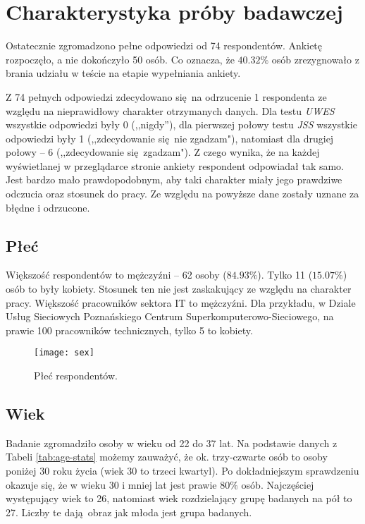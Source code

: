 \chapter{Charakterystyka próby badawczej} 
\label{sec:group}
Ostatecznie zgromadzono pełne odpowiedzi od 74 respondentów. Ankietę rozpoczęło, a nie dokończyło 50 osób. Co oznacza, że $40.32\%$ osób zrezygnowało z brania udziału w teście na etapie wypełniania ankiety. 

Z 74 pełnych odpowiedzi zdecydowano się na odrzucenie 1 respondenta ze względu na nieprawidłowy charakter otrzymanych danych. Dla testu \emph{UWES} wszystkie odpowiedzi były 0 (,,nigdy''), dla pierwszej połowy testu \emph{JSS} wszystkie odpowiedzi były 1 (,,zdecydowanie się nie zgadzam"), natomiast dla drugiej połowy -- 6 (,,zdecydowanie się zgadzam"). Z czego wynika, że na każdej wyświetlanej w przeglądarce stronie ankiety respondent odpowiadał tak samo. Jest bardzo mało
prawdopodobnym, aby taki charakter miały jego prawdziwe odczucia oraz stosunek do pracy. Ze względu na powyższe dane zostały uznane za błędne i odrzucone.
\section{Płeć}
Większość respondentów to mężczyźni -- 62 osoby ($84.93\%$). Tylko 11 ($15.07\%$) osób to były kobiety. Stosunek ten nie jest zaskakujący ze względu na charakter pracy. Większość pracowników sektora IT to mężczyźni. Dla przykładu, w Dziale Usług Sieciowych Poznańskiego Centrum Superkomputerowo-Sieciowego, na prawie 100 pracowników technicznych, tylko 5 to kobiety.

\begin{figure}[h]
\begin{center}
\texttt{[image: sex]}
\end{center}
\caption{Płeć respondentów.}
\label{fig:sex}
\end{figure}

\section{Wiek}
\label{sec:group-age}

Badanie zgromadziło osoby w wieku od 22 do 37 lat. Na podstawie danych z Tabeli \ref{tab:age-stats} możemy zauważyć, że ok. trzy-czwarte osób to osoby poniżej 30 roku życia (wiek 30 to trzeci kwartyl). Po dokładniejszym sprawdzeniu okazuje się, że w wieku 30 i mniej lat jest prawie $80\%$ osób.  Najczęściej występujący wiek to 26, natomiast wiek rozdzielający grupę badanych na pół to 27. Liczby te dają obraz jak młoda jest grupa badanych. 

